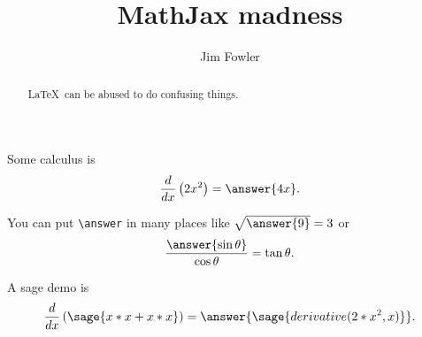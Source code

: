 \documentclass{ximera}
\title{MathJax madness}
\author{Jim Fowler}
\begin{document}
\begin{abstract}
  \LaTeX\ can be abused to do confusing things.
\end{abstract}

\maketitle

\begin{problem}
  Some calculus is
  \[
    \frac{d}{dx} \left( 2x^2 \right) = \answer{4x}.
  \]

  You can put \verb|\answer| in many places
    like \(\sqrt{\answer{9}} = 3\)
    or \[
      \frac{\answer{\sin \theta}}{\cos \theta} = \tan \theta.
    \]
\end{problem}

\begin{problem}
  A sage demo is
  \[
    \frac{d}{dx} \left( \sage{x*x + x*x} \right) =
      \answer{\sage{derivative(2*x^2,x)}}.
  \]
\end{problem}
\end{document}
